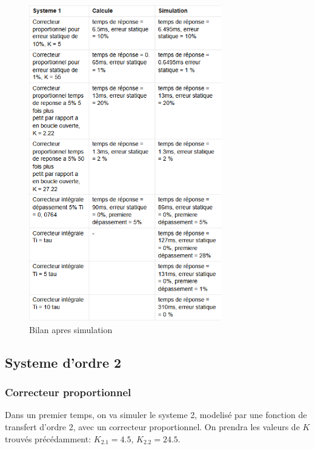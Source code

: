 \documentclass[12pt, a4paper]{report}
\begin{document}
\begin{figure}[H]
    \centering
    \includegraphics[width=0.75\textwidth]{bilan2.png}
    \caption{Bilan apres simulation}
\end{figure}

\subsection{Systeme d'ordre 2}

\subsubsection{Correcteur proportionnel}

Dans un premier temps, on va simuler le systeme 2, modelisé par une fonction de transfert d'ordre 2, avec un correcteur
proportionnel. On prendra les valeurs de $K$ trouvés précédamment: $K_{2.1} = 4.5$, $K_{2.2} = 24.5$.
\end{document}

